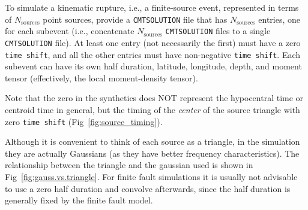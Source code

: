 \label{To-simulate-a}To simulate a kinematic rupture, i.e., a finite-source
event, represented in terms of $N_{\mathrm{sources}}$ point sources,
provide a \texttt{CMTSOLUTION} file that has $N_{\mathrm{sources}}$
entries, one for each subevent (i.e., concatenate $N_{\mathrm{sources}}$
\texttt{CMTSOLUTION} files to a single \texttt{CMTSOLUTION} file).
At least one entry (not necessarily the first) must have a zero \texttt{time
shift}, and all the other entries must have non-negative \texttt{time
shift}. Each subevent can have its own half duration, latitude, longitude,
depth, and moment tensor (effectively, the local moment-density tensor).\newline


Note that the zero in the synthetics does NOT represent the hypocentral
time or centroid time in general, but the timing of the \textit{center}
of the source triangle with zero \texttt{time shift} (Fig~\ref{fig:source_timing}).\newline


Although it is convenient to think of each source as a triangle, in
the simulation they are actually Gaussians (as they have better frequency
characteristics). The relationship between the triangle and the gaussian
used is shown in Fig~\ref{fig:gauss.vs.triangle}. For finite fault
simulations it is usually not advisable to use a zero half duration
and convolve afterwards, since the half duration is generally fixed
by the finite fault model.\newline

\vspace{1cm}


